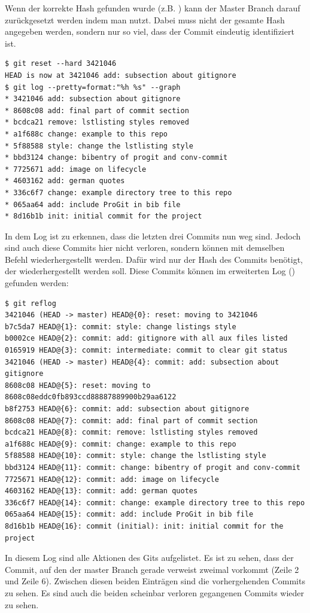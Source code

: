 Wenn der korrekte Hash gefunden wurde (z.B. )  kann der Master Branch darauf zurückgesetzt werden indem man  nutzt. Dabei muss nicht der gesamte Hash angegeben werden, sondern nur so viel, dass der Commit eindeutig identifiziert ist.
\begin{lstlisting}
$ git reset --hard 3421046
HEAD is now at 3421046 add: subsection about gitignore
$ git log --pretty=format:"%h %s" --graph
* 3421046 add: subsection about gitignore
* 8608c08 add: final part of commit section
* bcdca21 remove: lstlisting styles removed
* a1f688c change: example to this repo
* 5f88588 style: change the lstlisting style
* bbd3124 change: bibentry of progit and conv-commit
* 7725671 add: image on lifecycle
* 4603162 add: german quotes
* 336c6f7 change: example directory tree to this repo
* 065aa64 add: include ProGit in bib file
* 8d16b1b init: initial commit for the project
\end{lstlisting}
In dem Log ist zu erkennen, dass die letzten drei Commits nun weg sind. Jedoch sind auch diese Commits hier nicht verloren, sondern können mit demselben Befehl wiederhergestellt werden. Dafür wird nur der Hash des Commits benötigt, der wiederhergestellt werden soll. Diese Commits können im erweiterten Log () gefunden werden:
\begin{lstlisting}
$ git reflog
3421046 (HEAD -> master) HEAD@{0}: reset: moving to 3421046
b7c5da7 HEAD@{1}: commit: style: change listings style
b0002ce HEAD@{2}: commit: add: gitignore with all aux files listed
0165919 HEAD@{3}: commit: intermediate: commit to clear git status
3421046 (HEAD -> master) HEAD@{4}: commit: add: subsection about gitignore
8608c08 HEAD@{5}: reset: moving to 8608c08eddc0fb893ccd88887889900b29aa6122
b8f2753 HEAD@{6}: commit: add: subsection about gitignore
8608c08 HEAD@{7}: commit: add: final part of commit section
bcdca21 HEAD@{8}: commit: remove: lstlisting styles removed
a1f688c HEAD@{9}: commit: change: example to this repo
5f88588 HEAD@{10}: commit: style: change the lstlisting style
bbd3124 HEAD@{11}: commit: change: bibentry of progit and conv-commit
7725671 HEAD@{12}: commit: add: image on lifecycle
4603162 HEAD@{13}: commit: add: german quotes
336c6f7 HEAD@{14}: commit: change: example directory tree to this repo
065aa64 HEAD@{15}: commit: add: include ProGit in bib file
8d16b1b HEAD@{16}: commit (initial): init: initial commit for the project
\end{lstlisting}
In diesem Log sind alle Aktionen des Gits aufgelistet. Es ist zu sehen, dass der Commit, auf den der master Branch gerade verweist zweimal vorkommt (Zeile 2 und Zeile 6). Zwischen diesen beiden Einträgen sind die vorhergehenden Commits zu sehen. Es sind auch die beiden scheinbar verloren gegangenen Commits wieder zu sehen.






